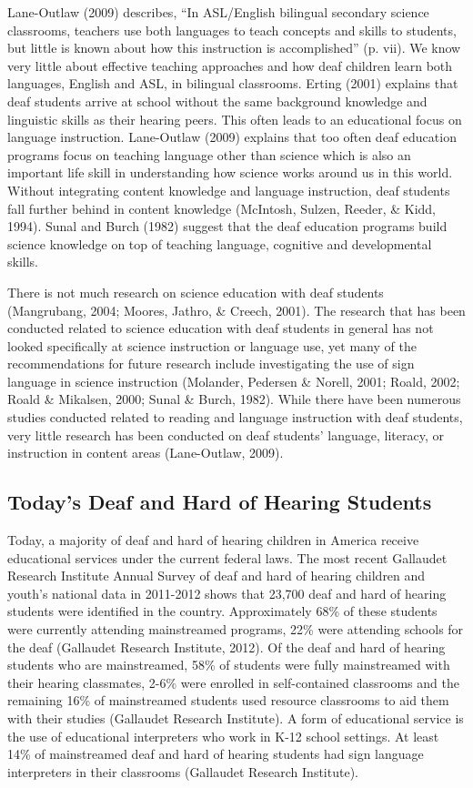 \documentclass[11.5pt]{sig-alternate} %
\begin{document}
\begin{large}
Lane-Outlaw (2009) describes, “In ASL/English bilingual secondary science classrooms, teachers use both languages to teach concepts and skills to students, but little is known about how this instruction is accomplished” (p. vii).  We know very little about effective teaching approaches and how deaf children learn both languages, English and ASL, in bilingual classrooms. Erting (2001) explains that deaf students arrive at school without the same background knowledge and linguistic skills as their hearing peers. This often leads to an educational focus on language instruction. Lane-Outlaw (2009) explains that too often deaf education programs focus on teaching language other than science which is also an important life skill in understanding how science works around us in this world. Without integrating content knowledge and language instruction, deaf students fall further behind in content knowledge (McIntosh, Sulzen, Reeder, \& Kidd, 1994).  Sunal and Burch (1982) suggest that the deaf education programs build science knowledge on top of teaching language, cognitive and developmental skills. 

There is not much research on science education with deaf students (Mangrubang, 2004; Moores, Jathro, \& Creech, 2001). The research that has been conducted related to science education with deaf students in general has not looked specifically at science instruction or language use, yet many of the recommendations for future research include investigating the use of sign language in science instruction (Molander, Pedersen \& Norell, 2001; Roald, 2002; Roald \& Mikalsen, 2000; Sunal \& Burch, 1982). While there have been numerous studies conducted related to reading and language instruction with deaf students, very little research has been conducted on deaf students' language, literacy, or instruction in content areas (Lane-Outlaw, 2009). 

\subsection*{Today’s Deaf and Hard of Hearing Students}

Today, a majority of deaf and hard of hearing children in America receive    educational services under the current federal laws. The most recent Gallaudet Research Institute Annual Survey of deaf and hard of hearing children and youth’s national data in 2011-2012 shows that 23,700 deaf and hard of hearing students were identified in the country. Approximately 68\% of these students were currently attending mainstreamed programs, 22\% were attending schools for the deaf (Gallaudet Research Institute, 2012). Of the deaf and hard of hearing students who are mainstreamed, 58\% of students were fully mainstreamed with their hearing classmates, 2-6\% were enrolled in self-contained classrooms and the remaining 16\% of mainstreamed students used resource classrooms to aid them with their studies (Gallaudet Research Institute). A form of educational service is the use of educational interpreters who work in K-12 school settings. At least 14\% of mainstreamed deaf and hard of hearing students had sign language interpreters in their classrooms (Gallaudet Research Institute). 


\end{large}
\end{document}
